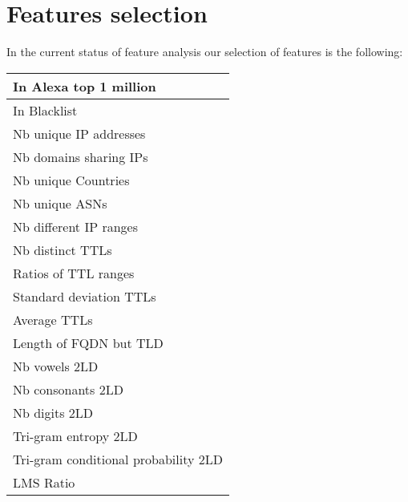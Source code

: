 \section{Features selection}
In the current status of feature analysis our selection of features is the following:
\begin{tabular}{|l|}
\hline
In Alexa top 1 million\\
\hline
In Blacklist\\
\hline
Nb unique IP addresses\\
\hline
Nb domains sharing IPs\\
\hline
Nb unique Countries\\
\hline
Nb unique ASNs\\
\hline
Nb different IP ranges\\
\hline
Nb distinct TTLs\\
\hline
Ratios of TTL ranges\\
\hline
Standard deviation TTLs\\
\hline
Average TTLs\\
\hline
Length of FQDN but TLD\\
\hline
Nb vowels 2LD\\
\hline
Nb consonants 2LD\\
\hline
Nb digits 2LD\\
\hline
Tri-gram entropy 2LD\\
\hline
Tri-gram conditional probability 2LD\\
\hline
LMS Ratio\\
\hline
\end{tabular}
